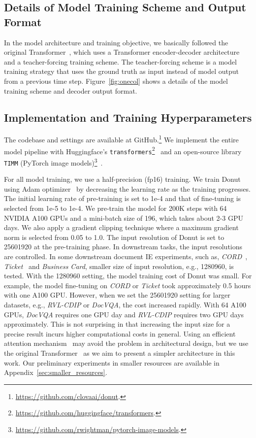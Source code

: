 \documentclass[runningheads]{llncs}
\newcommand\ours{{{\mbox{Donut}}}\xspace}
\begin{document}
\subsection{Details of Model Training Scheme and Output Format}\label{sec:detail_of_scheme_and_format}
In the model architecture and training objective, we basically followed the original Transformer~\cite{vaswani2017transformer}, which uses a Transformer encoder-decoder architecture and a teacher-forcing training scheme.
The teacher-forcing scheme is a model training strategy that uses the ground truth as input instead of model output from a previous time step.
Figure~\ref{fig:onecol} shows a details of the model training scheme and decoder output format.

\subsection{Implementation and Training Hyperparameters}\label{sec:detail_of_implementation_and_hyperparams}
The codebase and settings are available at GitHub.\footnote{\url{https://github.com/clovaai/donut}.}
We implement the entire model pipeline with Huggingface's \texttt{transformers}\footnote{\url{https://github.com/huggingface/transformers}.}~\cite{wolf-etal-2020-transformers} and an open-source library \texttt{TIMM} (PyTorch image models)\footnote{\url{https://github.com/rwightman/pytorch-image-models}.}~\cite{rw2019timm}.

For all model training, we use a half-precision (fp16) training.
We train \ours using Adam optimizer~\cite{Adamoptim} by decreasing the learning rate as the training progresses.
The initial learning rate of pre-training is set to 1e-4 and that of fine-tuning is selected from 1e-5 to 1e-4.
We pre-train the model for 200K steps with 64 NVIDIA A100 GPUs and a mini-batch size of 196,
which takes about 2-3 GPU days.
We also apply a gradient clipping technique where a maximum gradient norm is selected from 0.05 to 1.0.
The input resolution of \ours is set to 25601920 at the pre-training phase.
In downstream tasks, the input resolutions are controlled.
In some downstream document IE experiments, such as, \textit{CORD}~\cite{park2019cord}, \textit{Ticket}~\cite{eaten} and \textit{Business Card}, smaller size of input resolution, e.g., 1280960, is tested.
With the 1280960 setting, the model training cost of \ours was small.
For example, the model fine-tuning on \textit{CORD} or \textit{Ticket} took approximately 0.5 hours with one A100 GPU. However, when we set the 25601920 setting for larger datasets, e.g., \textit{RVL-CDIP} or \textit{DocVQA}, the cost increased rapidly. With 64 A100 GPUs, \textit{DocVQA} requires one GPU day and \textit{RVL-CDIP} requires two GPU days approximately. This is not surprising in that increasing the input size for a precise result incurs higher computational costs in general. Using an efficient attention mechanism~\cite{wang2020linformer} may avoid the problem in architectural design, but we use the original Transformer~\cite{vaswani2017transformer} as we aim to present a simpler architecture in this work. Our preliminary experiments in smaller resources are available in Appendix~\ref{sec:smaller_resources}.
\end{document}
